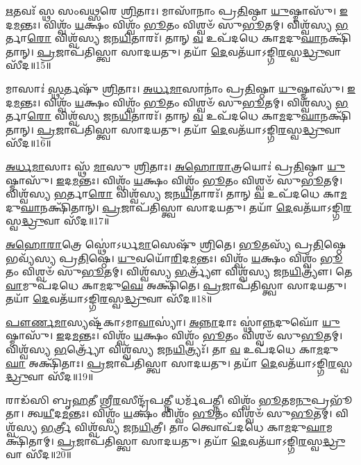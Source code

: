    \ul{𑌋}\-𑌤𑌵𑌃᳴ 𑌸𑍍𑌥 𑌸𑌂𑌵\-\ul{𑌥𑍍𑌸}\-𑌰𑍇 \ul{𑌶𑍍𑌰𑌿}\-𑌤𑌾𑌃।
   𑌮𑌾𑌸𑌾᳴𑌨𑌾𑌂 𑌪𑍍𑌰\-\ul{𑌤𑌿}\-𑌷𑍍𑌠𑌾 \ul{𑌯𑍁}\-𑌷𑍍𑌮𑌾𑌸𑍁᳴। 
   \ul{𑌇}\-𑌦\-\ul{𑌮}\-𑌨𑍍𑌤𑌃।
   𑌵𑌿𑌶𑍍𑌵𑌂᳴ \ul{𑌯}\-𑌕𑍍𑌷𑌂 𑌵𑌿𑌶𑍍𑌵𑌂᳴ \ul{𑌭𑍂}\-𑌤𑌂 𑌵𑌿𑌶𑍍𑌵𑍞᳴ 𑌸𑍁\-\ul{𑌭𑍂}\-𑌤𑌮𑍍।
   𑌵𑌿𑌶𑍍𑌵᳴𑌸𑍍𑌯 \ul{𑌭}\-𑌰𑍍𑌤𑌾\-\ul{𑌰𑍋} 𑌵𑌿𑌶𑍍𑌵᳴𑌸𑍍𑌯 𑌜𑌨\-\ul{𑌯𑌿}\-𑌤𑌾𑌰𑌃᳴।
   𑌤𑌾𑌨𑍍 \ul{𑌵} 𑌉𑌪᳴𑌦𑌧𑍇 𑌕𑌾\-\ul{𑌮}\-𑌦𑍁\-\ul{𑌘𑌾}\-𑌨𑌕𑍍𑌷𑌿᳴𑌤𑌾𑌨𑍍।
   \ul{𑌪𑍍𑌰}\-𑌜𑌾𑌪᳴𑌤𑌿𑌸𑍍𑌤𑍍𑌵𑌾 𑌸𑌾𑌦𑌯𑌤𑍁।
   𑌤𑌯𑌾᳴ \ul{𑌦𑍇}\-𑌵𑌤᳴𑌯𑌾𑌽𑌙𑍍𑌗𑌿\-\ul{𑌰}\-𑌸𑍍𑌵\-\ul{𑌦𑍍𑌧𑍍𑌰𑍁}\-𑌵𑌾 𑌸𑍀᳴𑌦॥15॥

   𑌮𑌾𑌸𑌾𑌃॑ \ul{𑌸𑍍𑌥}\-𑌰𑍍𑌤𑌷𑍁᳴ \ul{𑌶𑍍𑌰𑌿}\-𑌤𑌾𑌃।
   \ul{𑌅}\-\-\ul{𑌰𑍍𑌧}\-\-\ul{𑌮𑌾}\-𑌸𑌾𑌨𑌾𑌂॑ 𑌪𑍍𑌰\-\ul{𑌤𑌿}\-𑌷𑍍𑌠𑌾 \ul{𑌯𑍁}\-𑌷𑍍𑌮𑌾𑌸𑍁᳴। 
   \ul{𑌇}\-𑌦\-\ul{𑌮}\-𑌨𑍍𑌤𑌃।
   𑌵𑌿𑌶𑍍𑌵𑌂᳴ \ul{𑌯}\-𑌕𑍍𑌷𑌂 𑌵𑌿𑌶𑍍𑌵𑌂᳴ \ul{𑌭𑍂}\-𑌤𑌂 𑌵𑌿𑌶𑍍𑌵𑍞᳴ 𑌸𑍁\-\ul{𑌭𑍂}\-𑌤𑌮𑍍।
   𑌵𑌿𑌶𑍍𑌵᳴𑌸𑍍𑌯 \ul{𑌭}\-𑌰𑍍𑌤𑌾\-\ul{𑌰𑍋} 𑌵𑌿𑌶𑍍𑌵᳴𑌸𑍍𑌯 𑌜𑌨\-\ul{𑌯𑌿}\-𑌤𑌾𑌰𑌃᳴।
   𑌤𑌾𑌨𑍍 \ul{𑌵} 𑌉𑌪᳴𑌦𑌧𑍇 𑌕𑌾\-\ul{𑌮}\-𑌦𑍁\-\ul{𑌘𑌾}\-𑌨𑌕𑍍𑌷𑌿᳴𑌤𑌾𑌨𑍍।
   \ul{𑌪𑍍𑌰}\-𑌜𑌾𑌪᳴𑌤𑌿𑌸𑍍𑌤𑍍𑌵𑌾 𑌸𑌾𑌦𑌯𑌤𑍁।
   𑌤𑌯𑌾᳴ \ul{𑌦𑍇}\-𑌵𑌤᳴𑌯𑌾𑌽𑌙𑍍𑌗𑌿\-\ul{𑌰}\-𑌸𑍍𑌵\-\ul{𑌦𑍍𑌧𑍍𑌰𑍁}\-𑌵𑌾 𑌸𑍀᳴𑌦॥16॥

   \ul{𑌅}\-\-\ul{𑌰𑍍𑌧}\-\-\ul{𑌮𑌾}\-𑌸𑌾𑌃 𑌸𑍍𑌥᳴ \ul{𑌮𑌾}\-𑌸𑍁 \ul{𑌶𑍍𑌰𑌿}\-𑌤𑌾𑌃।
   \ul{𑌅}\-\-\ul{𑌹𑍋}\-\-\ul{𑌰𑌾}\-𑌤𑍍𑌰𑌯𑍋𑌃॑ 𑌪𑍍𑌰\-\ul{𑌤𑌿}\-𑌷𑍍𑌠𑌾 \ul{𑌯𑍁}\-𑌷𑍍𑌮𑌾𑌸𑍁᳴। 
   \ul{𑌇}\-𑌦\-\ul{𑌮}\-𑌨𑍍𑌤𑌃।
   𑌵𑌿𑌶𑍍𑌵𑌂᳴ \ul{𑌯}\-𑌕𑍍𑌷𑌂 𑌵𑌿𑌶𑍍𑌵𑌂᳴ \ul{𑌭𑍂}\-𑌤𑌂 𑌵𑌿𑌶𑍍𑌵𑍞᳴ 𑌸𑍁\-\ul{𑌭𑍂}\-𑌤𑌮𑍍।
   𑌵𑌿𑌶𑍍𑌵᳴𑌸𑍍𑌯 \ul{𑌭}\-𑌰𑍍𑌤𑌾\-\ul{𑌰𑍋} 𑌵𑌿𑌶𑍍𑌵᳴𑌸𑍍𑌯 𑌜𑌨\-\ul{𑌯𑌿}\-𑌤𑌾𑌰𑌃᳴।
   𑌤𑌾𑌨𑍍 \ul{𑌵} 𑌉𑌪᳴𑌦𑌧𑍇 𑌕𑌾\-\ul{𑌮}\-𑌦𑍁\-\ul{𑌘𑌾}\-𑌨𑌕𑍍𑌷𑌿᳴𑌤𑌾𑌨𑍍।
   \ul{𑌪𑍍𑌰}\-𑌜𑌾𑌪᳴𑌤𑌿𑌸𑍍𑌤𑍍𑌵𑌾 𑌸𑌾𑌦𑌯𑌤𑍁।
   𑌤𑌯𑌾᳴ \ul{𑌦𑍇}\-𑌵𑌤᳴𑌯𑌾𑌽𑌙𑍍𑌗𑌿\-\ul{𑌰}\-𑌸𑍍𑌵\-\ul{𑌦𑍍𑌧𑍍𑌰𑍁}\-𑌵𑌾 𑌸𑍀᳴𑌦॥17॥

   \ul{𑌅}\-\-\ul{𑌹𑍋}\-\-\ul{𑌰𑌾}\-𑌤𑍍𑌰𑍇 𑌸𑍍𑌥𑍋॑𑌽𑌰𑍍𑌧\-\ul{𑌮𑌾}\-𑌸𑍇𑌷𑍁᳴ \ul{𑌶𑍍𑌰𑌿}\-𑌤𑍇।
   \ul{𑌭𑍂}\-𑌤𑌸𑍍𑌯᳴ 𑌪𑍍𑌰\-\ul{𑌤𑌿}\-𑌷𑍍𑌠𑍇 𑌭𑌵𑍍𑌯᳴𑌸𑍍𑌯 𑌪𑍍𑌰\-\ul{𑌤𑌿}\-𑌷𑍍𑌠𑍇।
   \ul{𑌯𑍁}\-𑌵𑌯𑍋᳴\-\ul{𑌰𑌿}\-𑌦\-\ul{𑌮}\-𑌨𑍍𑌤𑌃।
   𑌵𑌿𑌶𑍍𑌵𑌂᳴ \ul{𑌯}\-𑌕𑍍𑌷𑌂 𑌵𑌿𑌶𑍍𑌵𑌂᳴ \ul{𑌭𑍂}\-𑌤𑌂 𑌵𑌿𑌶𑍍𑌵𑍞᳴ 𑌸𑍁\-\ul{𑌭𑍂}\-𑌤𑌮𑍍।
   𑌵𑌿𑌶𑍍𑌵᳴𑌸𑍍𑌯 \ul{𑌭}\-𑌰𑍍𑌤𑍍𑌰𑍍𑌯𑍗᳴ 𑌵𑌿𑌶𑍍𑌵᳴𑌸𑍍𑌯 𑌜𑌨\-\ul{𑌯𑌿}\-𑌤𑍍𑌰𑍍𑌯𑍗॑।
   𑌤𑍇 \ul{𑌵𑌾}\-𑌮𑍁𑌪᳴𑌦𑌧𑍇 𑌕𑌾\-\ul{𑌮}\-𑌦𑍁\-\ul{𑌘𑍇} 𑌅𑌕𑍍𑌷𑌿᳴𑌤𑍇।
   \ul{𑌪𑍍𑌰}\-𑌜𑌾𑌪᳴𑌤𑌿𑌸𑍍𑌤𑍍𑌵𑌾 𑌸𑌾𑌦𑌯𑌤𑍁।
   𑌤𑌯𑌾᳴ \ul{𑌦𑍇}\-𑌵𑌤᳴𑌯𑌾𑌽𑌙𑍍𑌗𑌿\-\ul{𑌰}\-𑌸𑍍𑌵\-\ul{𑌦𑍍𑌧𑍍𑌰𑍁}\-𑌵𑌾 𑌸𑍀᳴𑌦॥18॥

   \ul{𑌪𑍗}\-\-\ul{𑌰𑍍𑌣}\-\-\ul{𑌮𑌾}\-𑌸𑍍𑌯𑌷𑍍𑌟᳴𑌕𑌾𑌽𑌮𑌾\-\ul{𑌵𑌾}\-𑌸𑍍𑌯𑌾॑।
   \ul{𑌅}\-\-\ul{𑌨𑍍𑌨𑌾}\-𑌦𑌾𑌃 𑌸𑍍𑌥𑌾॑\-\ul{𑌨𑍍𑌨}\-𑌦𑍁𑌘𑍋᳴ \ul{𑌯𑍁}\-𑌷𑍍𑌮𑌾𑌸𑍁᳴। 
   \ul{𑌇}\-𑌦\-\ul{𑌮}\-𑌨𑍍𑌤𑌃।
   𑌵𑌿𑌶𑍍𑌵𑌂᳴ \ul{𑌯}\-𑌕𑍍𑌷𑌂 𑌵𑌿𑌶𑍍𑌵𑌂᳴ \ul{𑌭𑍂}\-𑌤𑌂 𑌵𑌿𑌶𑍍𑌵𑍞᳴ 𑌸𑍁\-\ul{𑌭𑍂}\-𑌤𑌮𑍍।
   𑌵𑌿𑌶𑍍𑌵᳴𑌸𑍍𑌯 \ul{𑌭}\-𑌰𑍍𑌤𑍍𑌰𑍍𑌯𑍋᳴ 𑌵𑌿𑌶𑍍𑌵᳴𑌸𑍍𑌯 𑌜𑌨\-\ul{𑌯𑌿}\-𑌤𑍍𑌰𑍍𑌯𑌃᳴।
   𑌤𑌾 \ul{𑌵} 𑌉𑌪᳴𑌦𑌧𑍇 𑌕𑌾\-\ul{𑌮}\-𑌦𑍁\-\ul{𑌘𑌾} 𑌅𑌕𑍍𑌷𑌿᳴𑌤𑌾𑌃।
   \ul{𑌪𑍍𑌰}\-𑌜𑌾𑌪᳴𑌤𑌿𑌸𑍍𑌤𑍍𑌵𑌾 𑌸𑌾𑌦𑌯𑌤𑍁।
   𑌤𑌯𑌾᳴ \ul{𑌦𑍇}\-𑌵𑌤᳴𑌯𑌾𑌽𑌙𑍍𑌗𑌿\-\ul{𑌰}\-𑌸𑍍𑌵\-\ul{𑌦𑍍𑌧𑍍𑌰𑍁}\-𑌵𑌾 𑌸𑍀᳴𑌦॥19॥

   𑌰𑌾𑌡᳴𑌸𑌿 𑌬𑍃\-\ul{𑌹}\-𑌤𑍀 𑌶𑍍𑌰𑍀\-\ul{𑌰}\-𑌸𑍀𑌨𑍍𑌦𑍍𑌰᳴𑌪\-\ul{𑌤𑍍𑌨𑍀} 𑌧𑌰𑍍𑌮᳴𑌪𑌤𑍍𑌨𑍀।
   𑌵𑌿𑌶𑍍𑌵𑌂᳴ \ul{𑌭𑍂}\-𑌤𑌮\-\ul{𑌨𑍁}\-𑌪𑍍𑌰𑌭𑍂᳴𑌤𑌾।
   𑌤𑍍𑌵\-\ul{𑌯𑍀}\-𑌦\-\ul{𑌮}\-𑌨𑍍𑌤𑌃।
   𑌵𑌿𑌶𑍍𑌵𑌂᳴ \ul{𑌯}\-𑌕𑍍𑌷𑌂 𑌵𑌿𑌶𑍍𑌵𑌂᳴ \ul{𑌭𑍂}\-𑌤𑌂 𑌵𑌿𑌶𑍍𑌵𑍞᳴ 𑌸𑍁\-\ul{𑌭𑍂}\-𑌤𑌮𑍍।
   𑌵𑌿𑌶𑍍𑌵᳴𑌸𑍍𑌯 \ul{𑌭}\-𑌰𑍍𑌤𑍍𑌰𑍀 𑌵𑌿𑌶𑍍𑌵᳴𑌸𑍍𑌯 𑌜𑌨\-\ul{𑌯𑌿}\-𑌤𑍍𑌰𑍀।
   𑌤𑌾𑌂 𑌤𑍍𑌵𑍋𑌪᳴𑌦𑌧𑍇 𑌕𑌾\-\ul{𑌮}\-𑌦𑍁\-\ul{𑌘𑌾}\-𑌮𑌕𑍍𑌷𑌿᳴𑌤𑌾𑌮𑍍।
   \ul{𑌪𑍍𑌰}\-𑌜𑌾𑌪᳴𑌤𑌿𑌸𑍍𑌤𑍍𑌵𑌾 𑌸𑌾𑌦𑌯𑌤𑍁।
   𑌤𑌯𑌾᳴ \ul{𑌦𑍇}\-𑌵𑌤᳴𑌯𑌾𑌽𑌙𑍍𑌗𑌿\-\ul{𑌰}\-𑌸𑍍𑌵\-\ul{𑌦𑍍𑌧𑍍𑌰𑍁}\-𑌵𑌾 𑌸𑍀᳴𑌦॥20॥

